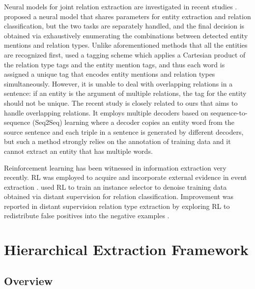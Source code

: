 \documentclass[letterpaper]{article}
\theoremstyle{definition}
\begin{document}
Neural models for joint relation extraction are investigated in recent studies \cite{katiyar2016investigating,zhang2017end}. \citeauthor{miwa2016end}  proposed a neural model that shares parameters for entity extraction and relation classification, but the two tasks are separately handled, and the final decision is obtained via exhaustively enumerating the combinations between detected entity mentions and relation types. Unlike aforementioned methods that all the entities are recognized first, \citeauthor{zheng2017joint}  used a tagging scheme which applies a Cartesian product of the relation type tags and the entity mention tags, and thus each word is assigned a unique tag that encodes entity mentions and relation types simultaneously. However, it is unable to deal with overlapping relations in a sentence: if an entity is the argument of multiple relations, the tag for the entity should not be unique.
The recent study \cite{zeng2018extracting} is closely related to ours that aims to handle overlapping relations. It employs multiple decoders based on sequence-to-sequence (Seq2Seq) learning where a decoder copies an entity word from the source sentence and each triple in a sentence is generated by different decoders, but such a method strongly relies on the annotation of training data and it cannot extract an entity that has multiple words.

Reinforcement learning has been witnessed in information extraction very recently. RL was employed to acquire and incorporate external evidence in event extraction \cite{narasimhan2016improving}. \citeauthor{feng2018reinforcement}  used RL to train an instance selector to denoise training data obtained via distant supervision for relation classification.
Improvement was reported in distant supervision relation type extraction by exploring RL to redistribute false positives into the negative examples \cite{qin2018robust}.

\section{Hierarchical Extraction Framework}


\subsection{Overview}
\end{document}
